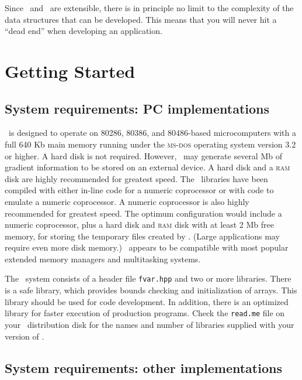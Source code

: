 \documentclass{admbmanual}
\begin{document}
Since \cplus\ and \scAD\ are extensible, there
is in principle no limit to the complexity of the data structures
that can be developed. This means that you will never hit a ``dead end''
when developing an application.






\chapter{Getting Started}


\section{System requirements: PC implementations}

\scAD\ is designed to operate on 80286, 80386, and 80486-based microcomputers
with a full 640 Kb main memory 
running under the \textsc{ms-dos} operating system version 3.2 or higher.
A hard disk is
not required.  However, \scAD\ may generate several Mb of gradient information
to be stored on an external device. A hard disk and a \textsc{ram} disk are highly
recommended for greatest speed. The \scAD\ libraries have been compiled with
either in-line code for a numeric coprocessor or with code to emulate
a numeric coprocessor. A numeric coprocessor is also highly recommended
for greatest speed. 
The optimum configuration would include a numeric coprocessor, plus a hard
disk and \textsc{ram} disk with at least 2 Mb free memory, for storing the temporary
files created by \scAD.  (Large applications may require even more disk
memory.)
\scAD\ appears to be compatible with most popular extended memory managers and
multitasking systems.

The \scAD\ system consists of a header file \texttt{fvar.hpp} and
two or more libraries. There is a safe library, which provides bounds checking
and initialization of arrays. This library should be used for code
development. In addition, there is an optimized library for faster execution
of production programs. Check the \texttt{read.me} file on your \scAD\
distribution disk for the names and number of libraries supplied with
your version of \scAD.


\section{System requirements: other implementations}
\end{document}
